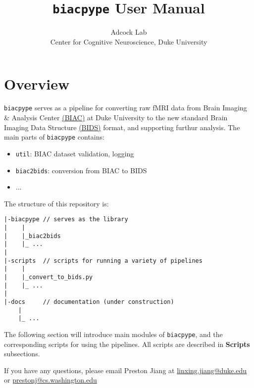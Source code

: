 \documentclass[12pt]{myland}
\begin{document}
\title{\texttt{biacpype} User Manual}
\author{\small{Adcock Lab} \\ \small{Center for Cognitive Neuroscience, Duke University}}
\maketitle
\tableofcontents
\newpage

\section{Overview}

    \texttt{biacpype} serves as a pipeline for converting raw fMRI data from Brain Imaging \& Analysis Center
    \href{https://www.biac.duke.edu/}{(BIAC)} at Duke University to the new standard Brain Imaging Data Structure
    \href{http://bids.neuroimaging.io/}{(BIDS)} format, and supporting furthur analysis. The main parts of
    \texttt{biacpype} contains:

    \begin{itemize}
        \item \texttt{util}: BIAC dataset validation, logging 
        \item \texttt{biac2bids}: conversion from BIAC to BIDS
        \item ...
    \end{itemize}

    The structure of this repository is: \par \vspace{.2in}

    \begin{lstlisting}
|-biacpype // serves as the library
|    |
|    |_biac2bids
|    |_ ...
|
|-scripts  // scripts for running a variety of pipelines
|    |
|    |_convert_to_bids.py
|    |_ ...
|
|-docs     // documentation (under construction)
    |
    |_ ...
    \end{lstlisting}

    The following section will introduce main modules of \texttt{biacpype}, and the corresponding scripts for using
    the pipelines. All scripts are described in \textbf{Scripts} subsections.

    If you have any questions, please email Preston Jiang at \href{mailto:linxing.jiang@duke.edu}{linxing.jiang@duke.edu}
    or \href{mailto:prestonj@cs.washington.edu}{prestonj@cs.washington.edu}  \par

\newpage
\end{document}
